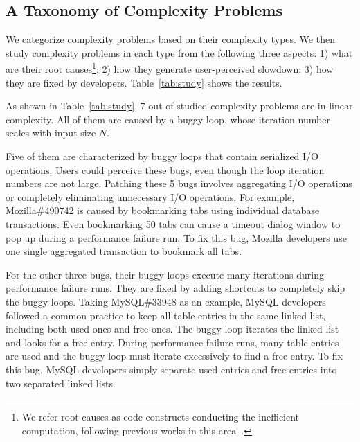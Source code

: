 \subsection{A Taxonomy of Complexity Problems}
\label{sec:tax}



We categorize complexity problems based on their complexity types.
We then study complexity problems in each type from the following three aspects:
1) what are their root causes\footnote{We refer root causes as code constructs 
conducting the inefficient computation, 
following previous works in this area~\cite{SongOOPSLA2014,ldoctor}.};
2) how they generate user-perceived slowdown;
3) how they are fixed by developers. 
Table~\ref{tab:study} shows the results. 

As shown in Table~\ref{tab:study}, 
7 out of \ComBugs studied complexity problems are in linear complexity. 
All of them are caused by a buggy loop, 
whose iteration number scales with input size $N$.

Five of them are characterized by buggy loops that contain serialized I/O operations.
Users could perceive these bugs, 
even though the loop iteration numbers are not large.
Patching these 5 bugs involves aggregating I/O operations 
or completely eliminating unnecessary I/O operations. 
For example, Mozilla\#490742 is caused by bookmarking 
tabs using individual database transactions. 
Even bookmarking 50 tabs can cause a timeout dialog 
window to pop up during a performance failure run. 
To fix this bug, Mozilla developers use one single aggregated transaction 
to bookmark all tabs.

For the other three bugs, 
their buggy loops execute many iterations during performance failure runs.
They are fixed by adding shortcuts to completely skip the buggy loops. 
Taking MySQL\#33948 as an example,
MySQL developers followed a common practice to keep all table entries in the same linked list, 
including both used ones and free ones. 
The buggy loop iterates the linked list and looks for a free entry.
During performance failure runs, 
many table entries are used and the buggy loop must iterate excessively to find a free entry.
To fix this bug, MySQL developers simply separate used entries and free entries 
into two separated linked lists. 


